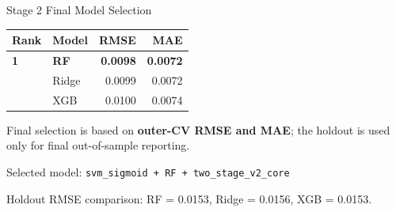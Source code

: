 \begin{frame}{Stage 2 Final Model Selection}
  \footnotesize
  \begin{table}
    \centering
    \renewcommand{\arraystretch}{1.15}
    \begin{tabular}{>{\raggedright\arraybackslash}p{}
                    >{\raggedright\arraybackslash}p{}
                    r r}
      \toprule
      Rank & Model & RMSE & MAE \\
      \midrule
      \textbf{1} & \textbf{RF} & \textbf{0.0098} & \textbf{0.0072} \\
      2 & Ridge & 0.0099 & 0.0072 \\
      3 & XGB & 0.0100 & 0.0074 \\
      \bottomrule
    \end{tabular}
  \end{table}

  \vspace{0.4em}
  \small
  Final selection is based on \textbf{outer-CV RMSE and MAE}; the holdout is used only for final out-of-sample reporting.

  \vspace{0.25em}
  \small
  Selected model: \texttt{svm\_sigmoid + RF + two\_stage\_v2\_core}

  \tiny
  Holdout RMSE comparison: RF = 0.0153, Ridge = 0.0156, XGB = 0.0153.
\end{frame}
